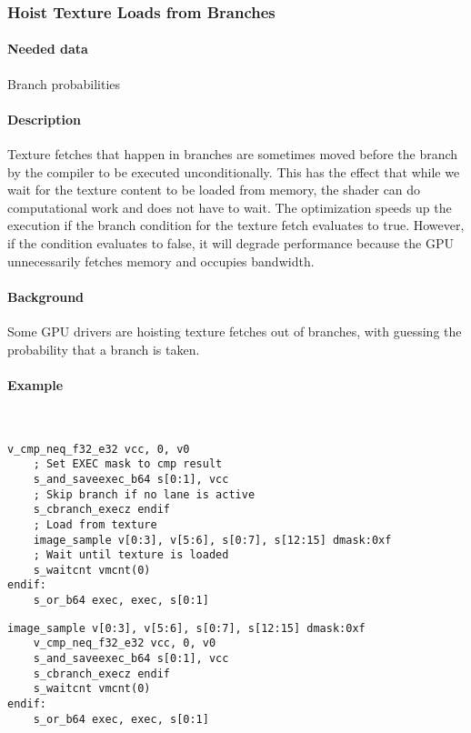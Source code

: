 \subsubsection{Hoist Texture Loads from Branches}
\paragraph{Needed data} Branch probabilities
\paragraph{Description} Texture fetches that happen in branches are sometimes moved before the branch by the compiler to be executed unconditionally. This has the effect that while we wait for the texture content to be loaded from memory, the shader can do computational work and does not have to wait. The optimization speeds up the execution if the branch condition for the texture fetch evaluates to true. However, if the condition evaluates to false, it will degrade performance because the GPU unnecessarily fetches memory and occupies bandwidth.
\paragraph{Background} Some GPU drivers are hoisting texture fetches out of branches, with guessing the probability that a branch is taken.
\paragraph{Example}\ \\
\begin{minipage}{.47\textwidth}
	\begin{lstlisting}[caption={Load Hoisting --- unoptimized},frame=tlrb,language={[amdgpu]Assembler}]
	v_cmp_neq_f32_e32 vcc, 0, v0
	; Set EXEC mask to cmp result
	s_and_saveexec_b64 s[0:1], vcc
	; Skip branch if no lane is active
	s_cbranch_execz endif
	; Load from texture
	image_sample v[0:3], v[5:6], s[0:7], s[12:15] dmask:0xf
	; Wait until texture is loaded
	s_waitcnt vmcnt(0)
endif:
	s_or_b64 exec, exec, s[0:1]
	\end{lstlisting}
\end{minipage}\hfill
\begin{minipage}{.47\textwidth}
	\begin{lstlisting}[caption={Load Hoisting --- optimized},frame=tlrb,language={[amdgpu]Assembler}]
	image_sample v[0:3], v[5:6], s[0:7], s[12:15] dmask:0xf
	v_cmp_neq_f32_e32 vcc, 0, v0
	s_and_saveexec_b64 s[0:1], vcc
	s_cbranch_execz endif
	s_waitcnt vmcnt(0)
endif:
	s_or_b64 exec, exec, s[0:1]
	\end{lstlisting}
\end{minipage}

